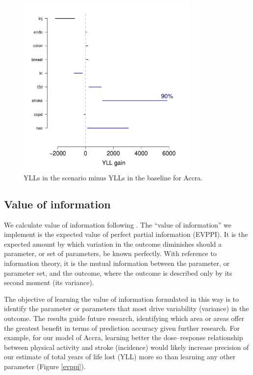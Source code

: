 \documentclass{article}
\begin{document}
\begin{figure}[h]
\includegraphics[width=0.8\textwidth]{accra_walk_yll.pdf}
\caption{\small YLLs in the scenario minus YLLs in the baseline for Accra.}
\label{results}
\end{figure}
\clearpage
\subsection{Value of information}

We calculate value of information following \citet{Jackson2017}. The ``value of information'' we implement is the expected value of perfect partial information (EVPPI). It is the expected amount by which variation in the outcome diminishes should a parameter, or set of parameters, be known perfectly. With reference to information theory, it is the mutual information between the parameter, or parameter set, and the outcome, where the outcome is described only by its second moment (its variance). 

The objective of learning the value of information formulated in this way is to identify the parameter or parameters that most drive variability (variance) in the outcome. The results guide future research, identifying which area or areas offer the greatest benefit in terms of prediction accuracy given further research. For example, for our model of Accra, learning better the dose--response relationship between physical activity and stroke (incidence) would likely increase precision of our estimate of total years of life lost (YLL) more so than learning any other parameter (Figure \ref{evppi}).
\end{document}
